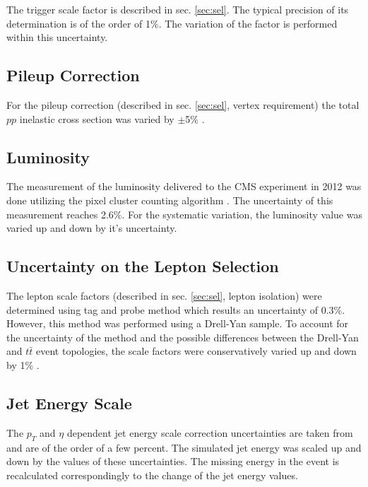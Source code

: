 The trigger scale factor is described in sec. \ref{sec:sel}. The typical precision of its determination is of the order
of 1\%. The variation of the factor is performed within this uncertainty.

\subsection{Pileup Correction}

For the pileup correction (described in sec. \ref{sec:sel}, vertex requirement) the total $pp$ inelastic cross section was varied by $\pm$5\% \cite{TWikiSystPU}.

\subsection{Luminosity}

The measurement of the luminosity delivered to the CMS experiment in 2012 was done utilizing the pixel cluster counting algorithm \cite{CMS-PAS-LUM-13-001, CMS:2012rua}.
The uncertainty of this measurement reaches 2.6\%\cite{CMS-PAS-LUM-13-001}. For the systematic variation, the luminosity value was varied up and down by it's uncertainty.

\subsection{Uncertainty on the Lepton Selection}

The lepton scale factors (described in sec. \ref{sec:sel}, lepton isolation) were determined using tag and probe method which results an uncertainty of 0.3\%\cite{Asin2014Auth}. 
However, this method was performed using a Drell-Yan sample. To account for the uncertainty of the method and the possible differences between the Drell-Yan and $t\bar{t}$ 
event topologies, the scale factors were conservatively varied up and down by 1\% \cite{AN-2012-389}.

\subsection{Jet Energy Scale}

The $p_{T}$ and $\eta$ dependent jet energy scale correction uncertainties are taken from \cite{CMS-PAS-JME-10-010} and are of the
order of a few percent. The simulated jet energy was scaled up and down by the values of these uncertainties. The missing energy in the 
event is recalculated correspondingly to the change of the jet energy values.

